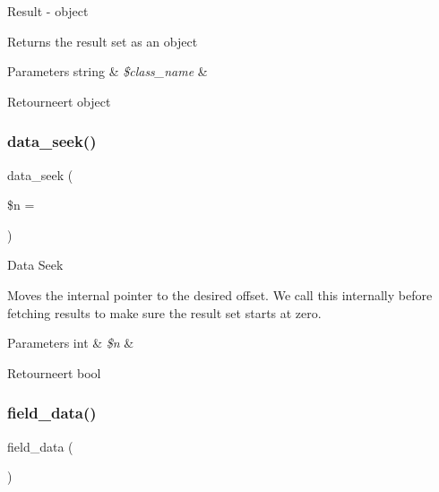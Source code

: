 Result -\/ object

Returns the result set as an object


\begin{DoxyParams}[1]{Parameters}
string & {\em \$class\+\_\+name} & \\
\hline
\end{DoxyParams}
\begin{DoxyReturn}{Retourneert}
object 
\end{DoxyReturn}
\mbox{\label{class_c_i___d_b__postgre__result_a8255ae91816e4206e29eb7581c5af0f1}} 
\subsubsection{\texorpdfstring{data\_seek()}{data\_seek()}}
{\footnotesize\ttfamily data\+\_\+seek (\begin{DoxyParamCaption}\item[{}]{\$n = {} }\end{DoxyParamCaption})}

Data Seek

Moves the internal pointer to the desired offset. We call this internally before fetching results to make sure the result set starts at zero.


\begin{DoxyParams}[1]{Parameters}
int & {\em \$n} & \\
\hline
\end{DoxyParams}
\begin{DoxyReturn}{Retourneert}
bool 
\end{DoxyReturn}
\mbox{\label{class_c_i___d_b__postgre__result_a84bffd65e53902ade1591716749a33e3}} 
\subsubsection{\texorpdfstring{field\_data()}{field\_data()}}
{\footnotesize\ttfamily field\+\_\+data (\begin{DoxyParamCaption}{ }\end{DoxyParamCaption})}

